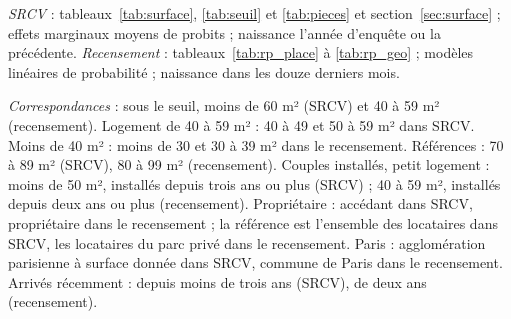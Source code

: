 \documentclass[11pt,a4paper]{article}
\theoremstyle{plain}
\theoremstyle{definition}
\theoremstyle{remark}
\begin{document}
\begin{table}[htbp]
\begin{threeparttable}
\begin{tablenotes}
\item \textit{SRCV} : tableaux~\ref{tab:surface}, \ref{tab:seuil} et \ref{tab:pieces} et section~\ref{sec:surface} ; effets marginaux moyens de probits ; naissance l'année d'enquête ou la précédente. \textit{Recensement} : tableaux~\ref{tab:rp_place} à \ref{tab:rp_geo} ; modèles linéaires de probabilité ; naissance dans les douze derniers mois.
\item \textit{Correspondances} : sous le seuil, moins de 60 m² (SRCV) et 40 à 59 m² (recensement). Logement de 40 à 59 m² : 40 à 49 et 50 à 59 m² dans SRCV. Moins de 40 m² : moins de 30 et 30 à 39 m² dans le recensement. Références : 70 à 89 m² (SRCV), 80 à 99 m² (recensement). Couples installés, petit logement : moins de 50 m², installés depuis trois ans ou plus (SRCV) ; 40 à 59 m², installés depuis deux ans ou plus (recensement). Propriétaire : accédant dans SRCV, propriétaire dans le recensement ; la référence est l'ensemble des locataires dans SRCV, les locataires du parc privé dans le recensement. Paris : agglomération parisienne à surface donnée dans SRCV, commune de Paris dans le recensement. Arrivés récemment : depuis moins de trois ans (SRCV), de deux ans (recensement).
\end{tablenotes}
\end{threeparttable}
\end{table}

\end{document}
